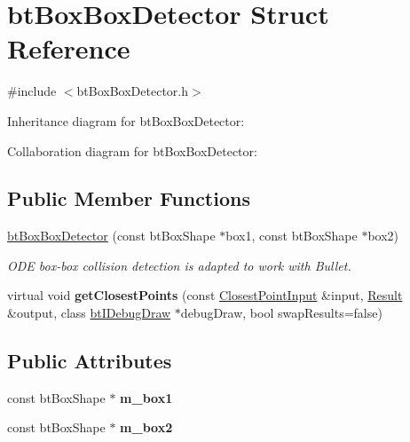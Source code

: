 \hypertarget{structbt_box_box_detector}{\section{bt\+Box\+Box\+Detector Struct Reference}
\label{structbt_box_box_detector}
}


{\ttfamily \#include $<$bt\+Box\+Box\+Detector.\+h$>$}



Inheritance diagram for bt\+Box\+Box\+Detector\+:


Collaboration diagram for bt\+Box\+Box\+Detector\+:
\subsection*{Public Member Functions}
\begin{DoxyCompactItemize}
\item 
\hypertarget{structbt_box_box_detector_a9ab1be9748aeb7cfceb274768910c895}{\hyperlink{structbt_box_box_detector_a9ab1be9748aeb7cfceb274768910c895}{bt\+Box\+Box\+Detector} (const bt\+Box\+Shape $\ast$box1, const bt\+Box\+Shape $\ast$box2)}\label{structbt_box_box_detector_a9ab1be9748aeb7cfceb274768910c895}

\begin{DoxyCompactList}\small\item\em O\+D\+E box-\/box collision detection is adapted to work with Bullet. \end{DoxyCompactList}\item 
\hypertarget{structbt_box_box_detector_a5718cdb1491b53850c928a4185844cbf}{virtual void {\bfseries get\+Closest\+Points} (const \hyperlink{structbt_discrete_collision_detector_interface_1_1_closest_point_input}{Closest\+Point\+Input} \&input, \hyperlink{structbt_discrete_collision_detector_interface_1_1_result}{Result} \&output, class \hyperlink{classbt_i_debug_draw}{bt\+I\+Debug\+Draw} $\ast$debug\+Draw, bool swap\+Results=false)}\label{structbt_box_box_detector_a5718cdb1491b53850c928a4185844cbf}

\end{DoxyCompactItemize}
\subsection*{Public Attributes}
\begin{DoxyCompactItemize}
\item 
\hypertarget{structbt_box_box_detector_a09718d4137fd2d7c5910018425e60427}{const bt\+Box\+Shape $\ast$ {\bfseries m\+\_\+box1}}\label{structbt_box_box_detector_a09718d4137fd2d7c5910018425e60427}

\item 
\hypertarget{structbt_box_box_detector_a51d455875659015c2f042cf0976a653e}{const bt\+Box\+Shape $\ast$ {\bfseries m\+\_\+box2}}\label{structbt_box_box_detector_a51d455875659015c2f042cf0976a653e}

\end{DoxyCompactItemize}


